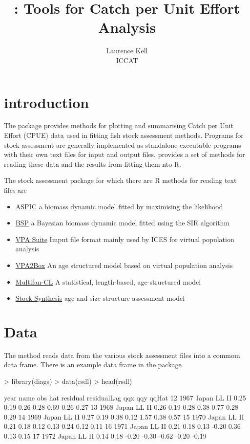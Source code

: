 \documentclass[shortnames,nojss,article]{jss}
\author{Laurence Kell\\ICCAT}
\title{\pkg{diags}: \proglang{R} Tools for Catch per Unit Effort Analysis}
\begin{document}


\tableofcontents
\newpage 

\section{introduction}

The  package provides methods for plotting and summarising Catch per Unit Effort (CPUE) data used in fitting fish stock assessment methods. Programs for stock assessment are generally implemented as  standalone executable programs with their own text files for input and output files.  provides a set of methods for reading these data and the results from fitting them nto R.

The stock assessment package for which there are R methods for reading text files are

\begin{itemize}
 \item \href{http://iccat.int/en/AssessCatalog.htm}{ASPIC} a biomass dynamic model fitted by maximising the likelihood 
 \item \href{http://iccat.int/en/AssessCatalog.htm}{BSP}  a Bayesian biomass dynamic model fitted using the SIR algorithm
 \item \href{http://www.ices.dk/committe/acom/wg/asoft/VPA/}{VPA Suite} Imput file format mainly used by ICES for virtual population analysis
 \item \href{http://iccat.int/en/AssessCatalog.htm}{VPA2Box} An age structured model based on virtual population analysis
 \item \href{http://www.multifan-cl.org}{Multifan-CL} A statistical, length-based, age-structured model
 \item \href{http://nft.nefsc.noaa.gov/Stock_Synthesis_3.htm}{Stock Synthesis} age and size structure assessment model
\end{itemize}


\section{Data}

The  method reads data from the various stock assessment files into a commom data frame.
There is an example data frame in the package

\begin{Schunk}
\begin{Sinput}
> library(diags)
> data(rsdl)
> head(rsdl)
\end{Sinput}
\begin{Soutput}
   year        name  obs  hat residual residualLag   qqx   qqy qqHat
12 1967 Japan LL II 0.25 0.19     0.26        0.28  0.69  0.26  0.27
13 1968 Japan LL II 0.26 0.19     0.28        0.38  0.77  0.28  0.29
14 1969 Japan LL II 0.27 0.19     0.38        0.12  1.57  0.38  0.57
15 1970 Japan LL II 0.21 0.18     0.12        0.13  0.24  0.12  0.11
16 1971 Japan LL II 0.21 0.18     0.13       -0.20  0.36  0.13  0.15
17 1972 Japan LL II 0.14 0.18    -0.20       -0.30 -0.62 -0.20 -0.19
\end{Soutput}
\end{Schunk}
\end{document}
